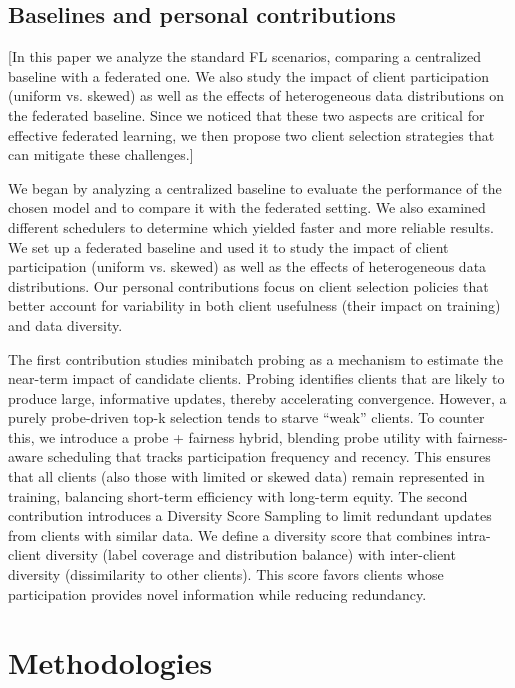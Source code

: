 \documentclass[10pt,twocolumn,letterpaper]{article}
\begin{document}
\subsection{Baselines and personal contributions}

[In this paper we analyze the standard FL scenarios, comparing a centralized baseline with a federated one. 
We also study the impact of client participation (uniform vs. skewed) as well as the effects of heterogeneous data distributions on the federated baseline.
Since we noticed that these two aspects are critical for effective federated learning, we then propose two client selection strategies that can mitigate these challenges.] 

We began by analyzing a centralized baseline to evaluate the performance of the chosen model and to compare it with the federated setting. We also examined different schedulers to determine which yielded faster and more reliable results.
We set up a federated baseline and used it to study the impact of client participation (uniform vs. skewed) as well as the effects of heterogeneous data distributions.
Our personal contributions focus on client selection policies that better account for variability in both client usefulness (their impact on training) and data diversity.

The first contribution studies minibatch probing as a mechanism to estimate the near-term impact of candidate clients. Probing identifies clients that are likely to produce large, informative updates, thereby accelerating convergence. However, a purely probe-driven top-k selection tends to starve “weak” clients. To counter this, we introduce a probe + fairness hybrid, blending probe utility with fairness-aware scheduling that tracks participation frequency and recency. This ensures that all clients (also those with limited or skewed data) remain represented in training, balancing short-term efficiency with long-term equity.
The second contribution introduces a Diversity Score Sampling to limit redundant updates from clients with similar data. We define a diversity score that combines intra-client diversity (label coverage and distribution balance) with inter-client diversity (dissimilarity to other clients). This score favors clients whose participation provides novel information while reducing redundancy.


\section{Methodologies}
\label{sec:formatting} 
\end{document}
